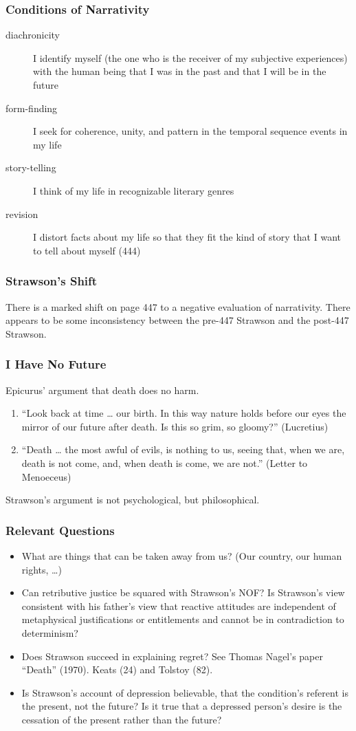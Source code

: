 \documentclass[xcolor=dvipsnames]{beamer}
\begin{document}
\begin{frame}
  \frametitle{Conditions of Narrativity}
  \begin{description}
  \item[diachronicity] I identify myself (the one who is the receiver
    of my subjective experiences) with the human being that I was in
    the past and that I will be in the future
  \item[form-finding] I seek for coherence, unity, and pattern in the
    temporal sequence events in my life
  \item[story-telling] I think of my life in recognizable literary
    genres
  \item[revision] I distort facts about my life so that they fit the
    kind of story that I want to tell about myself (444)
  \end{description}
\end{frame}

\begin{frame}
  \frametitle{Strawson's Shift}
  There is a marked shift on page 447 to a negative evaluation of
  narrativity. There appears to be some inconsistency between the
  pre-447 Strawson and the post-447 Strawson.
\end{frame}

\begin{frame}
  \frametitle{I Have No Future}
  Epicurus' argument that death does no harm.
  \begin{enumerate}
  \item ``Look back at time {\ldots} our birth. In this way nature
    holds before our eyes the mirror of our future after death. Is
    this so grim, so gloomy?'' (Lucretius)
  \item ``Death {\ldots} the most awful of evils, is nothing to us,
    seeing that, when we are, death is not come, and, when death is
    come, we are not.'' (Letter to Menoeceus)
  \end{enumerate}
Strawson's argument is not psychological, but philosophical. 
\end{frame}

\begin{frame}
  \frametitle{Relevant Questions}
  \begin{itemize}
  \item What are things that can be taken away from us? (Our country,
    our human rights, {\ldots})
  \item Can retributive justice be squared with Strawson's NOF? Is
    Strawson's view consistent with his father's view that reactive
    attitudes are independent of metaphysical justifications or
    entitlements and cannot be in contradiction to determinism?
  \item Does Strawson succeed in explaining regret? See Thomas Nagel's
    paper ``Death'' (1970). Keats (24) and Tolstoy (82). 
  \item Is Strawson's account of depression believable, that the
    condition's referent is the present, not the future? Is it true
    that a depressed person's desire is the cessation of the present
    rather than the future?
  \end{itemize}
\end{frame}
\end{document}
